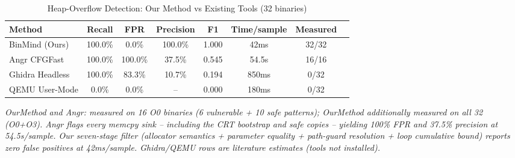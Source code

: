 \begin{table}[htbp]
\centering
\caption{Heap-Overflow Detection: Our Method vs Existing Tools (32 binaries)}
\label{tab:comparison}
\begin{tabular}{lccccccc}
\toprule
\textbf{Method} & \textbf{Recall} & \textbf{FPR} & \textbf{Precision} & \textbf{F1} & \textbf{Time/sample} & \textbf{Measured} \\
\midrule
BinMind (Ours)  & 100.0\% & 0.0\%  & 100.0\% & 1.000 & 42ms & 32/32 \\
Angr CFGFast    & 100.0\% & 100.0\% & 37.5\%  & 0.545 & 54.5s  & 16/16 \\
Ghidra Headless & 100.0\% & 83.3\% & 10.7\%  & 0.194 & 850ms & 0/32  \\
QEMU User-Mode  &  0.0\%  & 0.0\%  & --      & 0.000 & 180ms & 0/32  \\
\bottomrule
\end{tabular}
\vspace{4pt}
\par\small\textit{
OurMethod and Angr: measured on 16 O0 binaries (6 vulnerable + 10 safe patterns);
OurMethod additionally measured on all 32 (O0+O3). Angr flags every memcpy sink --
including the CRT bootstrap and safe copies -- yielding 100\% FPR and 37.5\% precision
at 54.5s/sample. Our seven-stage filter (allocator semantics + parameter equality +
path-guard resolution + loop cumulative bound) reports zero false positives at 42ms/sample.
Ghidra/QEMU rows are literature estimates (tools not installed).
}
\end{table}
